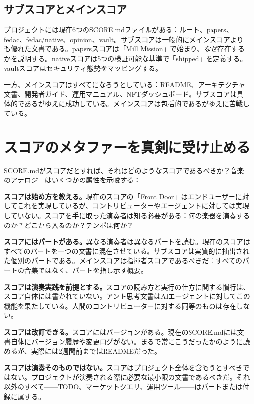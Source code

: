 \documentclass[10pt,letterpaper,twocolumn]{article}
\begin{document}
\subsection{サブスコアとメインスコア}

プロジェクトには現在6つのSCORE.mdファイルがある：ルート、papers、fedac、fedac/native、opinion、vault。サブスコアは一般的にメインスコアよりも優れた文書である。papersスコアは「Mill Mission」で始まり、\emph{なぜ}存在するかを説明する。nativeスコアは5つの検証可能な基準で「shipped」を定義する。vaultスコアはセキュリティ態勢をマッピングする。

一方、メインスコアはすべてになろうとしている：README、アーキテクチャ文書、開発者ガイド、運用マニュアル、NFTダッシュボード。サブスコアは具体的であるがゆえに成功している。メインスコアは包括的であるがゆえに苦戦している。

\section{スコアのメタファーを真剣に受け止める}

SCORE.mdがスコアだとすれば、それはどのようなスコアであるべきか？音楽のアナロジーはいくつかの属性を示唆する：

\textbf{スコアは始め方を教える。}現在のスコアの「Front Door」はエンドユーザーに対してこれを実現しているが、コントリビューターやエージェントに対しては実現していない。スコアを手に取った演奏者は知る必要がある：何の楽器を演奏するのか？どこから入るのか？テンポは何か？

\textbf{スコアにはパートがある。}異なる演奏者は異なるパートを読む。現在のスコアはすべてのパートを一つの文書に混在させている。サブスコアは実質的に抽出された個別のパートである。メインスコアは指揮者スコアであるべきだ：すべてのパートの合集ではなく、パートを指し示す概要。

\textbf{スコアは演奏実践を前提とする。}スコアの読み方と実行の仕方に関する慣行は、スコア自体には書かれていない。アント思考文書はAIエージェントに対してこの機能を果たしている。人間のコントリビューターに対する同等のものは存在しない。

\textbf{スコアは改訂できる。}スコアにはバージョンがある。現在のSCORE.mdには文書自体にバージョン履歴や変更ログがない。まるで常にこうだったかのように読めるが、実際には2週間前まではREADMEだった。

\textbf{スコアは演奏そのものではない。}スコアはプロジェクト全体を含もうとすべきではない。プロジェクトが演奏される際に必要な最小限の文書であるべきだ。それ以外のすべて——TODO、マーケットクエリ、運用ツール——はパートまたは付録に属する。
\end{document}
